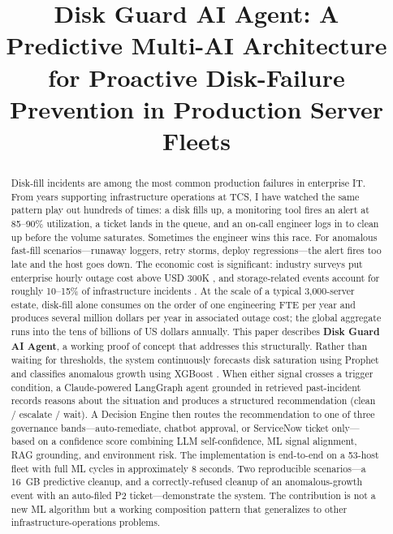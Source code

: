 \documentclass[conference]{IEEEtran}
\begin{document}
\title{Disk Guard AI Agent: A Predictive Multi-AI Architecture for
Proactive Disk-Failure Prevention in Production Server Fleets}

\author{
}

\maketitle

\begin{abstract}
Disk-fill incidents are among the most common production failures in
enterprise IT. From years supporting infrastructure operations at TCS,
I have watched the same pattern play out hundreds of times: a disk
fills up, a monitoring tool fires an alert at 85--90\% utilization, a
ticket lands in the queue, and an on-call engineer logs in to clean
up before the volume saturates. Sometimes the engineer wins this
race. For anomalous fast-fill scenarios---runaway loggers, retry
storms, deploy regressions---the alert fires too late and the host
goes down. The economic cost is significant: industry surveys put
enterprise hourly outage cost above USD 300K
\cite{itic2022downtime,lerner2014downtime}, and storage-related events
account for roughly 10--15\% of infrastructure incidents
\cite{notaro2021aiops}. At the scale of a typical 3{,}000-server
estate, disk-fill alone consumes on the order of one engineering FTE
per year and produces several million dollars per year in associated
outage cost; the global aggregate runs into the tens of billions of
US dollars annually. This paper describes \textbf{Disk Guard AI
Agent}, a working proof of concept that addresses this structurally.
Rather than waiting for thresholds, the system continuously forecasts
disk saturation using Prophet \cite{taylor2018forecasting} and
classifies anomalous growth using XGBoost \cite{chen2016xgboost}.
When either signal crosses a trigger condition, a Claude-powered
LangGraph agent \cite{anthropic2024claude3,langchain2024langgraph}
grounded in retrieved past-incident records \cite{lewis2020rag}
reasons about the situation and produces a structured recommendation
(clean / escalate / wait). A Decision Engine then routes the
recommendation to one of three governance bands---auto-remediate,
chatbot approval, or ServiceNow ticket only---based on a confidence
score combining LLM self-confidence, ML signal alignment, RAG
grounding, and environment risk. The implementation is end-to-end on
a 53-host fleet with full ML cycles in approximately 8 seconds. Two
reproducible scenarios---a 16~GB predictive cleanup, and a
correctly-refused cleanup of an anomalous-growth event with an
auto-filed P2 ticket---demonstrate the system. The contribution is
not a new ML algorithm but a working composition pattern that
generalizes to other infrastructure-operations problems.
\end{abstract}
\end{document}
